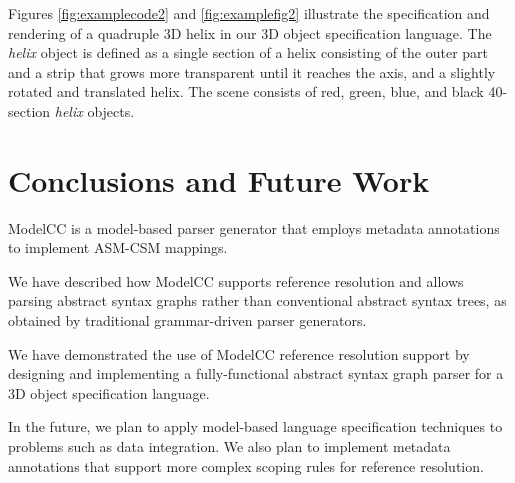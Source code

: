 \documentclass[floatfix,rmp,twocolumn,twoside]{revtex4}
\begin{document}
Figures \ref{fig:examplecode2} and \ref{fig:examplefig2} illustrate the specification and rendering of a quadruple 3D helix in our 3D object specification language. The \emph{helix} object is defined as a single section of a helix consisting of the outer part and a strip that grows more transparent until it reaches the axis, and a slightly rotated and translated helix. The scene consists of red, green, blue, and black 40-section \emph{helix} objects.


\section{Conclusions and Future Work} \label{sec:conclusionsandfuturework}

ModelCC is a model-based parser generator that employs metadata annotations to implement ASM-CSM mappings.

We have described how ModelCC supports reference resolution and allows parsing abstract syntax graphs rather than conventional abstract syntax trees, as obtained by traditional grammar-driven parser generators.

We have demonstrated the use of ModelCC reference resolution support by designing and implementing a fully-functional abstract syntax graph parser for a 3D object specification language.

In the future, we plan to apply model-based language specification techniques to problems such as data integration. We also plan to implement metadata annotations that support more complex scoping rules for reference resolution.

\renewcommand{\baselinestretch}{0.98}

{\small
}
\renewcommand{\baselinestretch}{1}
\end{document}
